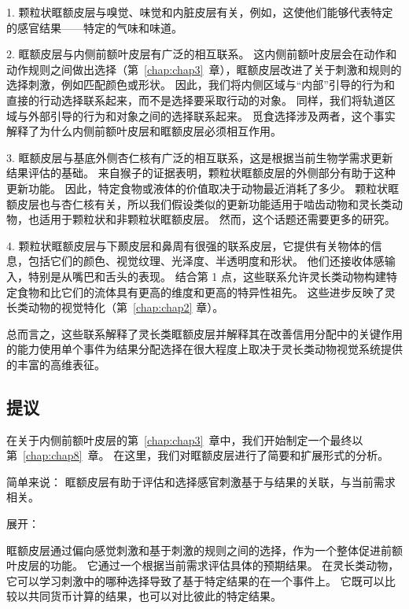1. 颗粒状眶额皮层与嗅觉、味觉和内脏皮层有关，例如，这使他们能够代表特定的感官结果——特定的气味和味道。\par


2. 眶额皮层与内侧前额叶皮层有广泛的相互联系。
这内侧前额叶皮层会在动作和动作规则之间做出选择（第~\ref{chap:chap3}~章），眶额皮层改进了关于刺激和规则的选择刺激，例如匹配颜色或形状。
因此，我们将内侧区域与“内部”引导的行为和直接的行动选择联系起来，而不是选择要采取行动的对象。
同样，我们将轨道区域与外部引导的行为和对象之间的选择联系起来。
觅食选择涉及两者，这个事实解释了为什么内侧前额叶皮层和眶额皮层必须相互作用。\par


3. 眶额皮层与基底外侧杏仁核有广泛的相互联系，这是根据当前生物学需求更新结果评估的基础。
来自猴子的证据表明，颗粒状眶额皮层的外侧部分有助于这种更新功能。
因此，特定食物或液体的价值取决于动物最近消耗了多少。
颗粒状眶额皮层也与杏仁核有关，所以我们假设类似的更新功能适用于啮齿动物和灵长类动物，也适用于颗粒状和非颗粒状眶额皮层。
然而，这个话题还需要更多的研究。\par


4. 颗粒状眶额皮层与下颞皮层和鼻周有很强的联系皮层，它提供有关物体的信息，包括它们的颜色、视觉纹理、光泽度、半透明度和形状。
他们还接收体感输入，特别是从嘴巴和舌头的表现。
结合第 1 点，这些联系允许灵长类动物构建特定食物和比它们的流体具有更高的维度和更高的特异性祖先。
这些进步反映了灵长类动物的视觉特化（第~\ref{chap:chap2} 章）。\par


总而言之，这些联系解释了灵长类眶额皮层并解释其在改善信用分配中的关键作用的能力使用单个事件为结果分配选择在很大程度上取决于灵长类动物视觉系统提供的丰富的高维表征。



\subsection{提议}

在关于内侧前额叶皮层的第~\ref{chap:chap3}~章中，我们开始制定一个最终以第~\ref{chap:chap8}~章。
在这里，我们对眶额皮层进行了简要和扩展形式的分析。\par


简单来说：
眶额皮层有助于评估和选择感官刺激基于与结果的关联，与当前需求相关。\par


展开：\par
眶额皮层通过偏向感觉刺激和基于刺激的规则之间的选择，作为一个整体促进前额叶皮层的功能。
它通过一个根据当前需求评估具体的预期结果。
在灵长类动物，它可以学习刺激中的哪种选择导致了基于特定结果的在一个事件上。
它既可以比较以共同货币计算的结果，也可以对比彼此的特定结果。\par



